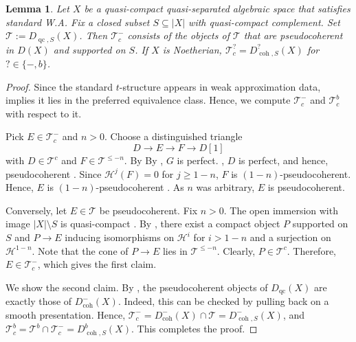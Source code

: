 \documentclass[11pt]{amsart}
\theoremstyle{plain}
\newtheorem{lemma}[theorem]{Lemma}
\theoremstyle{definition}
\numberwithin{equation}{section}
\numberwithin{theorem}{section}
\begin{document}
\begin{lemma}
    \label{lem:characterize_T-_c}
    Let $X$ be a quasi-compact quasi-separated algebraic space that satisfies standard W.A.
    Fix a closed subset $S\subseteq|X|$ with quasi-compact complement.
    Set $\mathcal{T}:=D_{\operatorname{qc},S}(X)$.
    Then $\mathcal{T}^-_c$ consists of the objects of $\mathcal{T}$ that are pseudocoherent in $D(X)$ and supported on $S$.
    If $X$ is Noetherian, $\mathcal{T}^?_c = D^?_{\operatorname{coh},S}(X)$ for $?\in \{-,b\}$.
\end{lemma}

\begin{proof}
    Since the standard $t$-structure appears in weak approximation data, \cite[Facts 1.26(i)]{Neeman:2026} implies it lies in the preferred equivalence class.
    Hence, we compute $\mathcal{T}^-_c$ and $\mathcal{T}^b_c$ with respect to it.
 
    Pick $E\in\mathcal{T}^-_c$ and $n>0$. 
    Choose a distinguished triangle
    \begin{displaymath}
        D\to E\to F\to D[1]
    \end{displaymath}
    with $D\in\mathcal{T}^c$ and $F\in\mathcal{T}^{\leq -n}$.
    By By \cite[\href{https://stacks.math.columbia.edu/tag/09M8}{Tag 09M8}]{StacksProject}, $G$ is perfect. , $D$ is perfect, and hence, pseudocoherent \cite[\href{https://stacks.math.columbia.edu/tag/08G8}{Tag 08G8}]{StacksProject}.
    Since $\mathcal{H}^j(F)=0$ for $j\geq 1-n$, $F$ is $(1-n)$-pseudocoherent.
    Hence, $E$ is $(1-n)$-pseudocoherent \cite[\href{https://stacks.math.columbia.edu/tag/08FV}{Tag 08FV}]{StacksProject}.
    As $n$ was arbitrary, $E$ is pseudocoherent.

    Conversely, let $E\in\mathcal{T}$ be pseudocoherent.
    Fix $n>0$.
    The open immersion with image $|X|\setminus S$ is quasi-compact \cite[\href{https://stacks.math.columbia.edu/tag/073B}{Tag 073B}]{StacksProject}.
    By \cite[\href{https://stacks.math.columbia.edu/tag/08HP}{Tag 08HP}]{StacksProject}, there exist a compact object $P$ supported on $S$ and $P\to E$ inducing isomorphisms on $\mathcal{H}^i$ for $i>1-n$ and a surjection on $\mathcal{H}^{1-n}$.
    Note that the cone of $P\to E$ lies in $\mathcal{T}^{\leq -n}$.
    Clearly, $P\in\mathcal{T}^c$.
    Therefore, $E\in\mathcal{T}^-_c$, which gives the first claim.

    We show the second claim. 
    By \cite[\href{https://stacks.math.columbia.edu/tag/08IK}{Tag 08IK}]{StacksProject}, the pseudocoherent objects of $D_{\operatorname{qc}}(X)$ are exactly those of $D^-_{\operatorname{coh}}(X)$.
    Indeed, this can be checked by pulling back on a smooth presentation.
    Hence, $\mathcal{T}^-_c = D^-_{\operatorname{coh}}(X) \cap \mathcal{T} = D^-_{\operatorname{coh},S}(X)$, and $\mathcal{T}^b_c = \mathcal{T}^b \cap\mathcal{T}^-_c =D^b_{\operatorname{coh},S}(X)$. 
    This completes the proof.
\end{proof}
\end{document}
